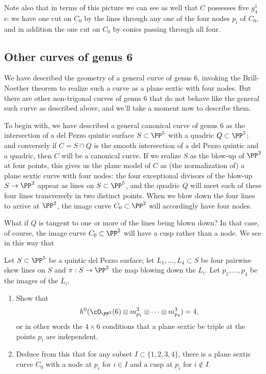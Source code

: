 Note also that in terms of this picture we can see as well that $C$ possesses five $g^1_4$s: we have one cut on $C_0$ by the lines through any one of the four nodes $p_i$ of $C_0$, and in addition the one cut on $C_0$ by conics passing through all four.

\subsection{Other curves of genus 6}

We have described the geometry of a general curve of genus 6, invoking the Brill-Noether theorem to realize such a curve as a plane sextic with four nodes. But there are other non-trigonal curves of genus 6 that do not behave like the general such curve as described above, and we'll take a moment now to describe them.

To begin with, we have described a general canonical curve of genus 6 as the intersection of a del Pezzo quintic surface $S \subset \PP^5$ with a quadric $Q \subset \PP^5$; and conversely if $C = S \cap Q$ is the smooth intersection of a del Pezzo quintic and a quadric, then $C$ will be a canonical curve. If we realize $S$ as the blow-up of $\PP^2$ at four points, this gives us the plane model of $C$ as (the normalization of) a plane sextic curve with four nodes: the four exceptional divisors of the blow-up $S \to \PP^2$ appear as lines on $S \subset \PP^5$, and the quadric $Q$ will meet each of these four lines transversely in two distinct points. When we blow down the four lines to arrive at $\PP^2$, the image curve $C_0 \subset \PP^2$ will accordingly have four nodes.

What if $Q$ is tangent to one or more of the lines being blown down? In that case, of course, the image curve $C_0 \subset \PP^2$ will have a cusp rather than a node. We see in this way that 

\begin{exercise}
Let $S \subset \PP^5$ be a quintic del Pezzo surface; let $L_1,\dots,L_4 \subset S$ be four pairwise skew lines on $S$ and $\pi : S \to \PP^2$ the map blowing down the $L_i$. Let $p_1,\dots,p_4 $ be the images of the $L_i$.
\begin{enumerate}
\item Show that 
$$
h^0(\cO_{\PP^2}(6) \otimes m_{p_1}^3 \otimes \dots \otimes m_{p_4}^3) = 4,
$$
or in other words the $4 \times 6$ conditions that a plane sextic be triple at the points $p_i$ are independent.
\item Deduce from this that for any subset $I \subset \{1,2,3,4\}$, there is a plane sextic curve $C_0$ with a node at $p_i$ for $i \in I$ and a cusp at $p_i$ for $i \notin I$.
\end{enumerate}
\end{exercise}

